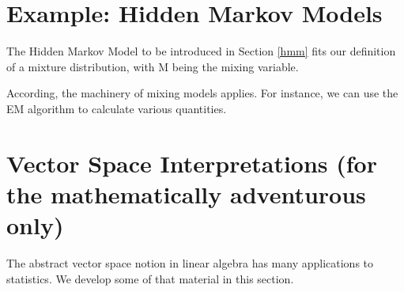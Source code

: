\section{Example:  Hidden Markov Models}

The Hidden Markov Model to be introduced in Section \ref{hmm} fits our
definition of a mixture distribution, with M being the mixing variable.

According, the machinery of mixing models applies.  For instance, we can
use the EM algorithm to calculate various quantities.

% 
% 
% 
% 
% 

% 
% 


\section{Vector Space Interpretations (for the mathematically
adventurous only)}
\label{adventure}

The abstract vector space notion in linear algebra has many applications
to statistics.  We develop some of that material in this section.


